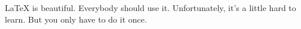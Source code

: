 \LaTeX{} is beautiful.
Everybody should use it.
Unfortunately, it's a little hard to learn.
But you only have to do it once.